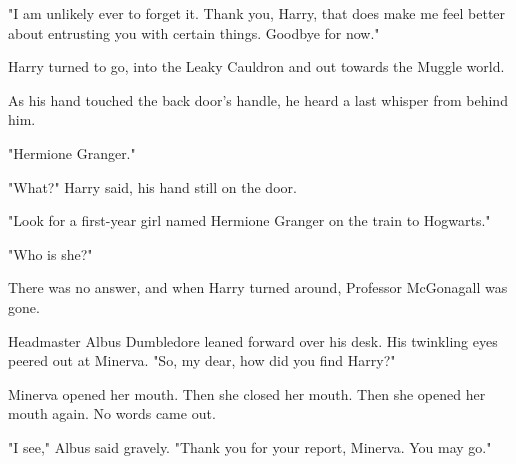 "I am unlikely ever to forget it. Thank you, Harry, that does make me feel
better about entrusting you with certain things. Goodbye for now."

Harry turned to go, into the Leaky Cauldron and out towards the Muggle world.

As his hand touched the back door's handle, he heard a last whisper from behind
him.

"Hermione Granger."

"What?" Harry said, his hand still on the door.

"Look for a first-year girl named Hermione Granger on the train to Hogwarts."

"Who is she?"

There was no answer, and when Harry turned around, Professor McGonagall was
gone.

Headmaster Albus Dumbledore leaned forward over his desk. His twinkling eyes
peered out at Minerva. "So, my dear, how did you find Harry?"

Minerva opened her mouth. Then she closed her mouth. Then she opened her mouth
again. No words came out.

"I see," Albus said gravely. "Thank you for your report, Minerva. You may go."
